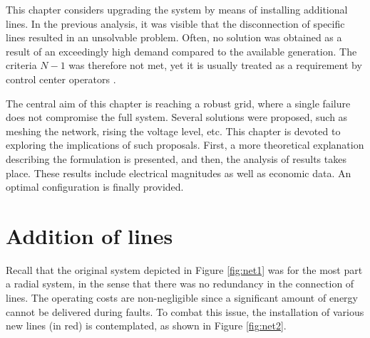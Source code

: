 This chapter considers upgrading the system by means of installing additional lines. In the previous analysis, it was visible that the disconnection of specific lines resulted in an unsolvable problem. Often, no solution was obtained as a result of an exceedingly high demand compared to the available generation. The criteria $N-1$ was therefore not met, yet it is usually treated as a requirement by control center operators \cite{wang2013risk, gourtani2016robust}. 

The central aim of this chapter is reaching a robust grid, where a single failure does not compromise the full system. Several solutions were proposed, such as meshing the network, rising the voltage level, etc. This chapter is devoted to exploring the implications of such proposals. First, a more theoretical explanation describing the formulation is presented, and then, the analysis of results takes place. These results include electrical magnitudes as well as economic data. An optimal configuration is finally provided.

\section{Addition of lines}
Recall that the original system depicted in Figure \ref{fig:net1} was for the most part a radial system, in the sense that there was no redundancy in the connection of lines. The operating costs are non-negligible since a significant amount of energy cannot be delivered during faults. To combat this issue, the installation of various new lines (in red) is contemplated, as shown in Figure \ref{fig:net2}.


